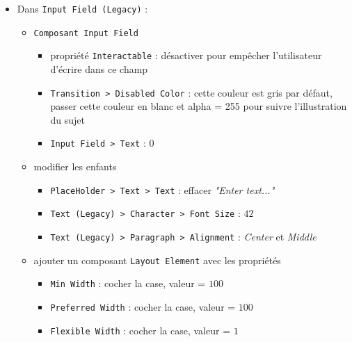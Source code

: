 \documentclass[a4paper,10pt]{article}
\newenvironment{solution}%
{\begin{tcolorbox}[breakable,colback=red!5!white,colframe=red!75!black,title=Solution]}%
{\end{tcolorbox}}
\begin{document}
\begin{solution}
\begin{itemize}
	\item Dans \texttt{Input Field (Legacy)} :
	\begin{itemize}
		\item \texttt{Composant Input Field}
		\begin{itemize}
			\item propriété \texttt{Interactable} : désactiver pour empêcher l'utilisateur d'écrire dans ce champ
			\item \texttt{Transition > Disabled Color} : cette couleur est gris par défaut, passer cette couleur en blanc et alpha = 255 pour suivre l'illustration du sujet
			\item \texttt{Input Field > Text} : $0$
		\end{itemize}
		\item modifier les enfants
		\begin{itemize}						
			\item \texttt{PlaceHolder > Text > Text} : effacer \textit{"Enter text..."}
			\item \texttt{Text (Legacy) > Character > Font Size} : $42$
			\item \texttt{Text (Legacy) > Paragraph > Alignment} : \textit{Center} et \textit{Middle}
		\end{itemize}		

		\item ajouter un composant \texttt{Layout Element} avec les propriétés
		\begin{itemize}			
			\item \texttt{Min Width} : cocher la case, valeur = $100$
			\item \texttt{Preferred Width} : cocher la case, valeur = $100$
			\item \texttt{Flexible Width} : cocher la case, valeur = $1$
		\end{itemize}	
	\end{itemize}		
	

\end{itemize}
\end{solution}
\end{document}
